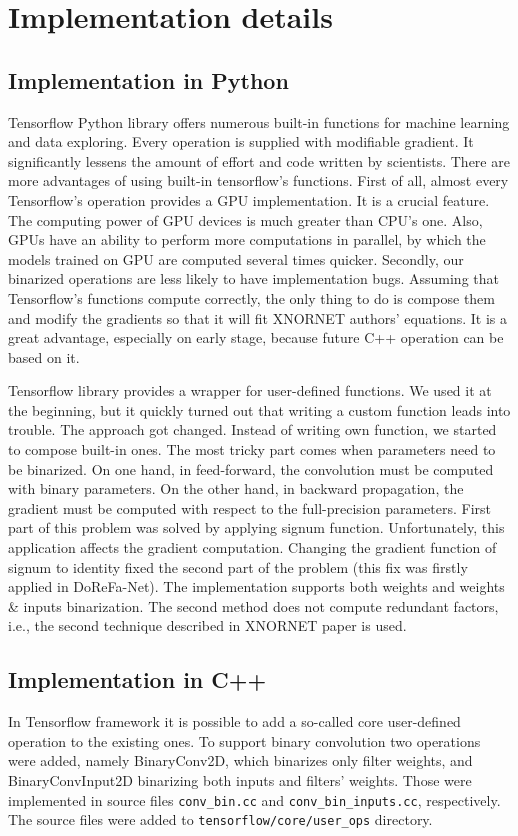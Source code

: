 \documentclass[licencjacka]{pracamgr}
\begin{document}
\chapter{Implementation details}

\section{Implementation in Python}
Tensorflow Python library offers numerous built-in functions for machine learning and data exploring. Every operation is supplied with modifiable gradient. It significantly lessens the amount of effort and code written by  scientists. There are more advantages of using built-in tensorflow's functions. First of all, almost every Tensorflow’s operation provides a GPU implementation. It is a crucial feature. The computing power of GPU devices is much greater than CPU's one. Also, GPUs have an ability to perform more computations in parallel, by which the models trained on GPU are computed several times quicker. Secondly, our binarized operations are less likely to have implementation bugs. Assuming that Tensorflow’s functions compute correctly, the only thing to do is compose them and modify the gradients so that it will fit XNORNET authors' equations. It is a great advantage, especially on early stage, because future C++ operation can be based on it.
		 
Tensorflow library provides a wrapper for user-defined functions. We used it at the beginning, but it quickly turned out that writing a custom function leads into trouble. The approach got changed. Instead of writing own function, we started to compose built-in ones. The most tricky part comes when parameters need to be binarized. On one hand, in feed-forward, the convolution must be computed with binary parameters. On the other hand, in backward propagation, the gradient must be computed with respect to the full-precision parameters. First part of this problem was solved by applying signum function. Unfortunately, this application affects the gradient computation. Changing the gradient function of signum to identity fixed the second part of the problem (this fix was firstly applied in DoReFa-Net). The implementation supports both weights and weights \& inputs binarization. The second method does not compute redundant factors, i.e., the second technique described in XNORNET paper \cite{xnornet} is used.

		\section{Implementation in C++}
		In Tensorflow framework it is possible to add a so-called core user-defined operation to the existing ones. To support binary convolution two operations were added, namely BinaryConv2D, which binarizes only filter weights, and BinaryConvInput2D binarizing both inputs and filters' weights. Those were implemented in source files \texttt{conv\_bin.cc} and \texttt{conv\_bin\_inputs.cc}, respectively. The source files were added to \texttt{tensorflow/core/user\_ops} directory.
		
\end{document}
